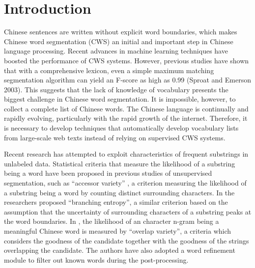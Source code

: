 \documentclass[english]{jnlp_1.4}
\begin{document}
\nocite{*}


\maketitle

\section{Introduction}

Chinese sentences are written without explicit word boundaries, which makes Chinese word segmentation (CWS) an initial and important step in Chinese language processing. Recent advances in machine learning techniques have boosted the performance of CWS systems. However, previous studies have shown that with a comprehensive lexicon, even a simple maximum matching segmentation algorithm can yield an F-score as high as 0.99 (Sproat and Emerson 2003)\nocite{sproat2003first}. This suggests that the lack of knowledge of vocabulary presents the biggest challenge in Chinese word segmentation. It is impossible, however, to collect a complete list of Chinese words. The Chinese language is continually and rapidly evolving, particularly with the rapid growth of the internet. Therefore, it is necessary to develop techniques that automatically develop vocabulary lists from large-scale web texts instead of relying on supervised CWS systems. 

Recent research has attempted to exploit characteristics of frequent substrings in unlabeled data. Statistical criteria that measure the likelihood of a substring being a word have been proposed in previous studies of unsupervised segmentation, such as ``accessor variety'' \cite{feng2004accessor}, a criterion measuring the likelihood of a substring being a word by counting distinct surrounding characters. In \cite{jin2006unsupervised} the researchers proposed ``branching entropy'', a similar criterion based on the assumption that the uncertainty of surrounding characters of a substring peaks at the word boundaries. In \cite{ye2013unknown}, the likelihood of an character n-gram being a meaningful Chinese word is measured by ``overlap variety'', a criteria which considers the goodness of the candidate together with the goodness of the strings overlapping the candidate. The authors have also adopted a word refinement module to filter out known words during the post-processing. 
\end{document}
